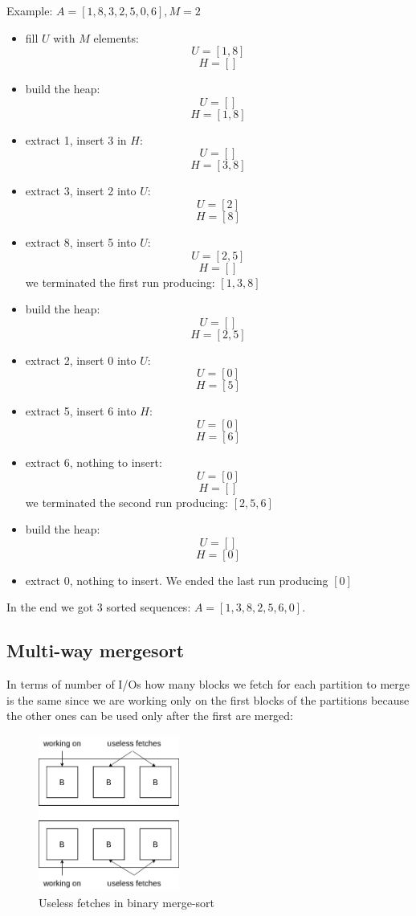 Example: $A = [1, 8, 3, 2, 5, 0, 6], M = 2$
\begin{itemize}
    \item fill $U$ with $M$ elements:
    $$ U = [1, 8] $$
    $$ H = [] $$
    
    \item build the heap:
    $$ U = [] $$
    $$ H = [1, 8] $$

    \item extract 1, insert 3 in $H$:
    $$ U = [] $$
    $$ H = [3, 8] $$

    \item extract 3, insert 2 into $U$:
    $$ U = [2] $$
    $$ H = [8] $$

    \item extract 8, insert 5 into $U$:
    $$ U = [2, 5] $$
    $$ H = [] $$
    we terminated the first run producing: $[1, 3, 8]$

    \item build the heap:
    $$ U = [] $$
    $$ H = [2, 5] $$

    \item extract 2, insert 0 into $U$:
    $$ U = [0] $$
    $$ H = [5] $$

    \item extract 5, insert 6 into $H$:
    $$ U = [0] $$
    $$ H = [6] $$

    \item extract 6, nothing to insert:
    $$ U = [0] $$
    $$ H = [] $$
    we terminated the second run producing: $[2, 5, 6]$

    \item build the heap:
    $$ U = [] $$
    $$ H = [0] $$
    
    \item extract 0, nothing to insert. We ended the last run producing $[0]$
\end{itemize}
In the end we got 3 sorted sequences: $A = [1, 3, 8, 2, 5, 6, 0]$.

\subsection{Multi-way mergesort}
In terms of number of I/Os how many blocks we fetch for each partition to merge is the same since we are working only on the first blocks of the partitions because the other ones can be used only after the first are merged: 
\begin{figure}[H]
    \centering
    \includegraphics[width=175px]{images/2_Sorting/useless_fetches.png}
    \caption{Useless fetches in binary merge-sort}
\end{figure}

